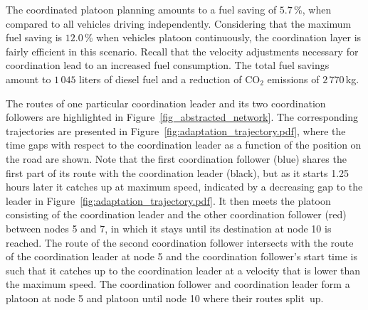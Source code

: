 \documentclass[journal]{IEEEtran}
\begin{document}
The coordinated platoon planning amounts to a fuel saving of $5.7$\,\%, when compared to all vehicles driving independently. Considering that the maximum fuel saving is $12.0$\,\% when vehicles platoon continuously, the coordination layer is fairly efficient in this scenario. Recall that the velocity adjustments necessary for coordination lead to an increased fuel consumption. The total fuel savings amount to $1\,045$ liters of diesel fuel and a reduction of CO$_2$ emissions of $2\,770$\,kg.

The routes of one particular coordination leader and its two coordination followers are highlighted in Figure~\ref{fig_abstracted_network}. The corresponding trajectories are presented in Figure~\ref{fig:adaptation_trajectory.pdf}, where the time gaps with respect to the coordination leader as a function of the position on the road are shown. Note that the first coordination follower (blue) shares the first part of its route with the coordination leader (black), but as it starts 1.25 hours later it catches up at maximum speed, indicated by a decreasing gap to the leader in Figure~\ref{fig:adaptation_trajectory.pdf}. It then meets the platoon consisting of the coordination leader and the other coordination follower (red) between nodes 5 and 7, in which it stays until its destination at node 10 is reached. The route of the second coordination follower intersects with the route of the coordination leader at node 5 and the coordination follower's start time is such that it catches up to the coordination leader at a velocity that is lower than the maximum speed. The coordination follower and coordination leader form a platoon at node 5 and platoon until node 10 where their routes split~up.
\end{document}

